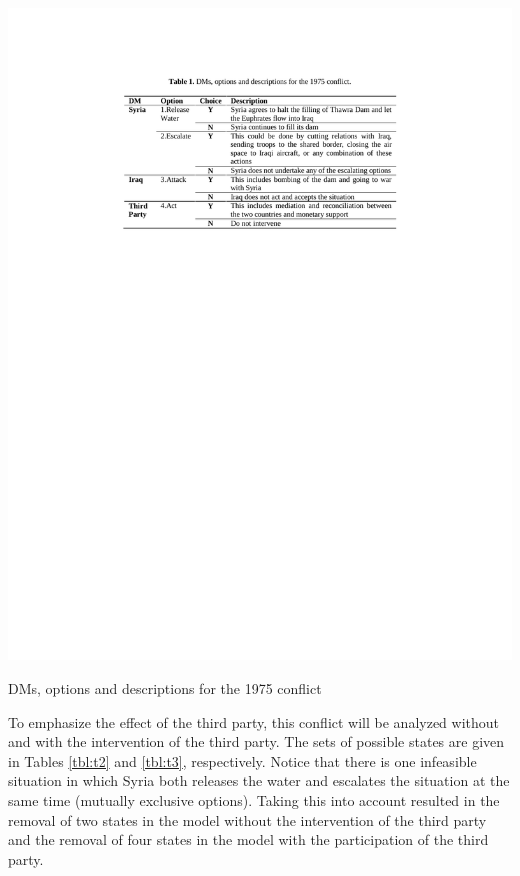 \documentclass[letterpaper,12pt,titlepage,oneside,final]{book}
\begin{document}
\begin{table}[H]
\centering
\includegraphics[scale=1]{PDF-IMG/tables/1.pdf}

\caption{DMs, options and descriptions for the 1975 conflict}

\label{tbl:t1}
\end{table}

To emphasize the effect of the third party, this conflict will be analyzed without and with the intervention of the third party. The sets of possible states are given in Tables \ref{tbl:t2} and \ref{tbl:t3}, respectively. Notice that there is one infeasible situation in which Syria both releases the water and escalates the situation at the same time (mutually exclusive options). Taking this into account resulted in the removal of two states in the model without the intervention of the third party and the removal of four states in the model with the participation of the third party.
\end{document}
